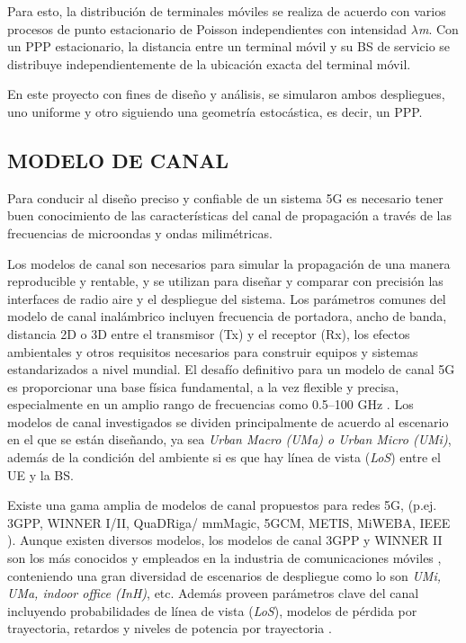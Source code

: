 Para esto, la distribución de terminales móviles se realiza de acuerdo con varios procesos de punto estacionario de Poisson independientes con intensidad \textit{$\lambda$m}. Con un PPP estacionario, la distancia entre un terminal móvil y su BS de servicio se distribuye independientemente de la ubicación exacta del terminal móvil.\newline

En este proyecto con fines de diseño y análisis, se simularon ambos despliegues, uno uniforme y otro siguiendo una geometría estocástica, es decir, un PPP.

\subsection{MODELO DE CANAL}

Para conducir al diseño preciso y confiable de un sistema 5G es necesario tener buen conocimiento de las características del canal de propagación a través de las frecuencias de microondas y ondas milimétricas. \newline

Los modelos de canal son necesarios para simular la propagación de una manera reproducible y rentable, y se utilizan para diseñar y comparar con precisión las interfaces de radio aire y el despliegue del sistema. Los parámetros comunes del modelo de canal inalámbrico incluyen frecuencia de portadora, ancho de banda, distancia 2D o 3D entre el transmisor (Tx) y el receptor (Rx), los efectos ambientales y otros requisitos necesarios para construir equipos y sistemas estandarizados a nivel mundial. El desafío definitivo para un modelo de canal 5G es proporcionar una base física fundamental, a la vez flexible y precisa, especialmente en un amplio rango de frecuencias como 0.5--100 GHz \parencite{Rappaport2017}. Los modelos de canal investigados se dividen principalmente de acuerdo al escenario en el que se están diseñando, ya sea \textit{Urban Macro (UMa) o Urban Micro (UMi)}, además de la condición del ambiente si es que hay línea de vista (\textit{LoS}) entre el UE y la BS.\newline

Existe una gama amplia de modelos de canal propuestos para redes 5G, (p.ej. 3GPP, WINNER I/II, QuaDRiga/ mmMagic, 5GCM, METIS, MiWEBA, IEEE \parencite{WirelessSim}). Aunque existen diversos modelos, los modelos de canal 3GPP y WINNER II son los más conocidos y empleados en la industria de comunicaciones móviles \parencite{Sun2016}, conteniendo una gran diversidad de escenarios de despliegue como lo son \textit{UMi, UMa, indoor office (InH)}, etc. Además proveen parámetros clave del canal incluyendo probabilidades de línea de vista (\textit{LoS}), modelos de pérdida por trayectoria, retardos y niveles de potencia por trayectoria \parencite{Sun2016}. \newline

